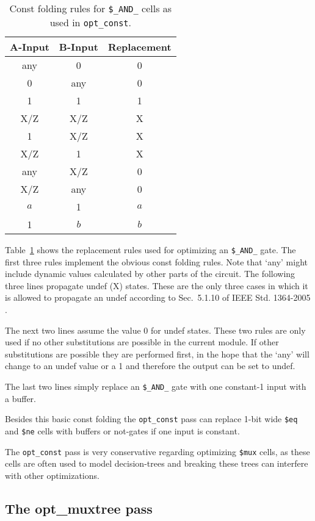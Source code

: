 \begin{table}
	\hfil
	\begin{tabular}{cc|c}
		A-Input & B-Input & Replacement \\
		\hline
		any &   0 &   0 \\
		  0 & any &   0 \\
		  1 &   1 &   1 \\
		\hline
		X/Z & X/Z &   X \\
		  1 & X/Z &   X \\
		X/Z &   1 &   X \\
		\hline
		any & X/Z &   0 \\
		X/Z & any &   0 \\
		\hline
		$a$ &   1 & $a$ \\
		  1 & $b$ & $b$ \\
	\end{tabular}
	\caption{Const folding rules for {\tt\$\_AND\_} cells as used in {\tt opt\_const}.}
	\label{tab:opt_const_and}
\end{table}

Table~\ref{tab:opt_const_and} shows the replacement rules used for optimizing
an {\tt\$\_AND\_} gate. The first three rules implement the obvious const folding
rules. Note that `any' might include dynamic values calculated by other parts
of the circuit. The following three lines propagate undef (X) states.
These are the only three cases in which it is allowed to propagate an undef
according to Sec.~5.1.10 of IEEE Std. 1364-2005 \cite{Verilog2005}.

The next two lines assume the value 0 for undef states. These two rules are only
used if no other substitutions are possible in the current module. If other substitutions
are possible they are performed first, in the hope that the `any' will change to
an undef value or a 1 and therefore the output can be set to undef.

The last two lines simply replace an {\tt\$\_AND\_} gate with one constant-1
input with a buffer.

Besides this basic const folding the {\tt opt\_const} pass can replace 1-bit wide
{\tt \$eq} and {\tt \$ne} cells with buffers or not-gates if one input is constant.

The {\tt opt\_const} pass is very conservative regarding optimizing {\tt \$mux} cells,
as these cells are often used to model decision-trees and breaking these trees can
interfere with other optimizations.

\subsection{The opt\_muxtree pass}

